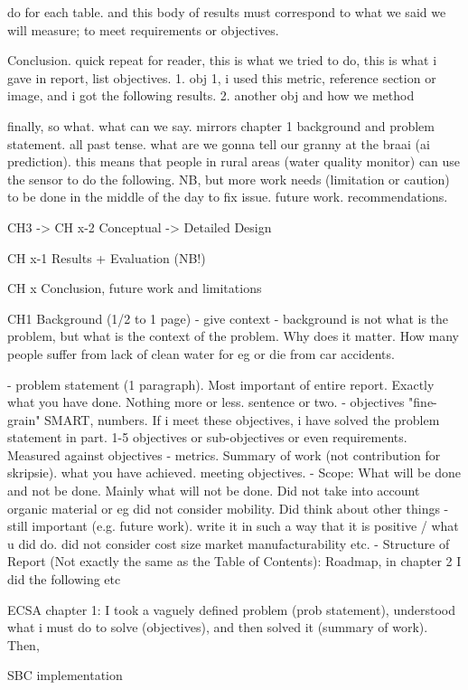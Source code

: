 do for each table. and this body of results must correspond to what we said we will measure; to meet requirements or objectives. 

Conclusion. 
quick repeat for reader, this is what we tried to do, this is what i gave in report, 
list objectives. 
1. obj 1, i used this metric, reference section or image, and i got the following results.
2. another obj and how we method

finally, so what. what can we say. mirrors chapter 1 background and problem statement. all past tense. what are we gonna tell our granny at the braai (ai prediction). this means that people in rural areas (water quality monitor) can use the sensor to do the following. NB, but more work needs (limitation or caution) to be done in the middle of the day to fix issue. 
future work. recommendations. 

CH3 -> CH x-2
Conceptual -> Detailed Design

CH x-1
Results + Evaluation (NB!)

CH x
Conclusion, future work and limitations



CH1
 Background (1/2 to 1 page) - give context
- background is not what is the problem, but what is the context of the problem. Why does it matter. How many people suffer from lack of clean water for eg or die from car accidents. 

- problem statement (1 paragraph). Most important of entire report. Exactly what you have done. Nothing more or less. sentence or two. 
- objectives "fine-grain" SMART, numbers. If i meet these objectives, i have solved the problem statement in part. 1-5 objectives or sub-objectives or even requirements. Measured against objectives - metrics. 
Summary of work (not contribution for skripsie). what you have achieved. meeting objectives. 
- Scope: What will be done and not be done. Mainly what will not be done. Did not take into account organic material or eg did not consider mobility. Did think about other things - still important (e.g. future work). write it in such a way that it is positive  / what u did do. did not consider cost size market manufacturability etc. 
- Structure of Report (Not exactly the same as the Table of Contents): Roadmap, in chapter 2 I did the following etc

ECSA chapter 1: I took a vaguely defined problem (prob statement), understood what i must do to solve (objectives), and then solved it (summary of work).
Then, 


SBC implementation
